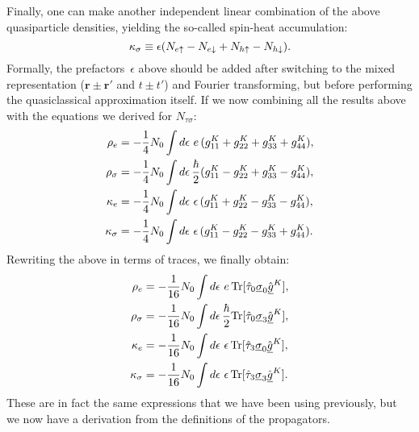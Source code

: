 Finally, one can make another independent linear combination of the above quasiparticle densities, yielding the so-called spin-heat accumulation:
\begin{equation}
  \kappa_\sigma \equiv \epsilon(N_{e\uparrow} - N_{e\downarrow} + N_{h\uparrow} - N_{h\downarrow}).
\end{equation}
Formally, the prefactors~$\epsilon$ above should be added after switching to the mixed representation ($\bm{r}\pm\bm{r}'$ and $t \pm t'$) and Fourier transforming, but before performing the quasiclassical approximation itself.
If we now combining all the results above with the equations we derived for $N_{\tau\sigma}$:
\begin{align}
  \rho_e        &= -\frac{1}{4} N_0 \int d\epsilon \, \,e\,           (g^K_{11} + g^K_{22} + g^K_{33} + g^K_{44}), \\
  \rho_\sigma   &= -\frac{1}{4} N_0 \int d\epsilon \, \frac{\hbar}{2} (g^K_{11} - g^K_{22} + g^K_{33} - g^K_{44}), \\
  \kappa_e      &= -\frac{1}{4} N_0 \int d\epsilon \, \,\epsilon\,    (g^K_{11} + g^K_{22} - g^K_{33} - g^K_{44}), \\
  \kappa_\sigma &= -\frac{1}{4} N_0 \int d\epsilon \, \,\epsilon\,    (g^K_{11} - g^K_{22} - g^K_{33} + g^K_{44}).
\end{align}
Rewriting the above in terms of traces, we finally obtain:
\begin{align}
  \rho_e        &= -\frac{1}{16} N_0 \int d\epsilon \,  \,e\,           \text{Tr}[\hat{\tau}_0 \underline{\sigma}_0 \hat{\underline{g}}^K], \\
  \rho_\sigma   &= -\frac{1}{16} N_0 \int d\epsilon \,  \frac{\hbar}{2} \text{Tr}[\hat{\tau}_0 \underline{\sigma}_3 \hat{\underline{g}}^K], \\
  \kappa_e      &= -\frac{1}{16} N_0 \int d\epsilon \,  \,\epsilon\,    \text{Tr}[\hat{\tau}_3 \underline{\sigma}_0 \hat{\underline{g}}^K], \\
  \kappa_\sigma &= -\frac{1}{16} N_0 \int d\epsilon \,  \,\epsilon\,    \text{Tr}[\hat{\tau}_3 \underline{\sigma}_3 \hat{\underline{g}}^K].
\end{align}
These are in fact the same expressions that we have been using previously, but we now have a derivation from the definitions of the propagators.
